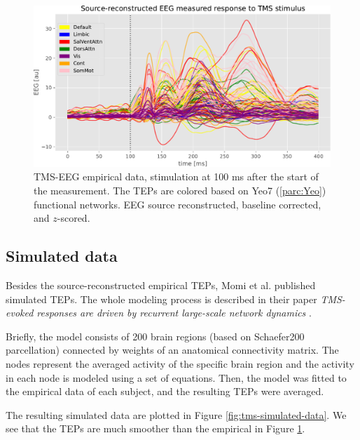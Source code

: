 \begin{figure}
    \centering
    \includegraphics[width=\textwidth]{images/nootebook_generated/tmseeg_results/empirical/200/not_over_threshold_nan/data.pdf}
    \caption[TMS-EEG empirical data]{TMS-EEG empirical data, stimulation at 100 ms after the start of the measurement. The TEPs are colored based on Yeo7 (\ref{parc:Yeo}) functional networks. EEG source reconstructed, baseline corrected, and $z$-scored.}
    \label{fig:tms-empirical-data}
\end{figure}

\subsection{Simulated data}

Besides the source-reconstructed empirical TEPs, Momi et al. published simulated TEPs. The whole modeling process is described in their paper \textit{TMS-evoked responses are driven by recurrent large-scale network dynamics} \cite{momi_tms-evoked_2023}. 

Briefly, the model consists of 200 brain regions (based on Schaefer200 parcellation) connected by weights of an anatomical connectivity matrix. The nodes represent the averaged activity of the specific brain region and the activity in each node is modeled using a set of equations. \cite{deco_perturbation_2018} Then, the model was fitted to the empirical data of each subject, and the resulting TEPs were averaged. \cite{momi_tms-evoked_2023}

The resulting simulated data are plotted in Figure \ref{fig:tms-simulated-data}. We see that the TEPs are much smoother than the empirical in Figure \ref{fig:tms-empirical-data}.

